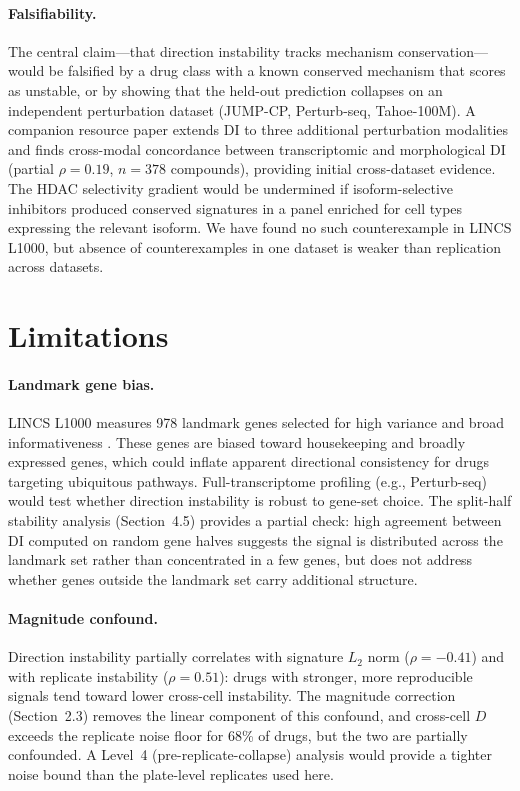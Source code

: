 \documentclass[11pt]{article}
\begin{document}
\paragraph{Falsifiability.}
The central claim---that direction instability tracks mechanism
conservation---would be falsified by a drug class with a known
conserved mechanism that scores as unstable, or by showing that the
held-out prediction collapses on an independent perturbation dataset
(JUMP-CP, Perturb-seq, Tahoe-100M).  A companion resource paper
\citep{tower2026atlas} extends DI to three additional perturbation
modalities and finds cross-modal concordance between transcriptomic
and morphological DI (partial $\rho = 0.19$, $n = 378$ compounds),
providing initial cross-dataset evidence.  The HDAC selectivity gradient would be
undermined if isoform-selective inhibitors produced conserved
signatures in a panel enriched for cell types expressing the relevant
isoform.  We have found no such counterexample in LINCS L1000, but
absence of counterexamples in one dataset is weaker than replication
across datasets.

\section{Limitations}

\paragraph{Landmark gene bias.}
LINCS L1000 measures 978 landmark genes selected for high variance and
broad informativeness \citep{subramanian2017next}.  These genes are
biased toward housekeeping and broadly expressed genes, which could
inflate apparent directional consistency for drugs targeting ubiquitous
pathways.  Full-transcriptome profiling (e.g., Perturb-seq) would test
whether direction instability is robust to gene-set choice.  The
split-half stability analysis (Section~4.5) provides a partial check:
high agreement between DI computed on random gene halves suggests the
signal is distributed across the landmark set rather than concentrated
in a few genes, but does not address whether genes outside the landmark
set carry additional structure.

\paragraph{Magnitude confound.}
Direction instability partially correlates with signature $L_2$ norm
($\rho = -0.41$) and with replicate instability ($\rho = 0.51$): drugs
with stronger, more reproducible signals tend toward lower cross-cell
instability.  The magnitude correction (Section~2.3) removes the linear
component of this confound, and cross-cell $D$ exceeds the replicate
noise floor for 68\% of drugs, but the two are partially confounded.
A Level~4 (pre-replicate-collapse) analysis would provide a tighter
noise bound than the plate-level replicates used here.
\end{document}
